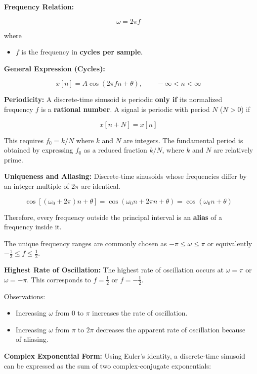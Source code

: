 \textbf{Frequency Relation:}

\[  
\omega=2\pi f  
\]

where

\begin{itemize}
\tightlist
\item
  \(f\) is the frequency in \textbf{cycles per sample}.
\end{itemize}

\textbf{General Expression (Cycles):}

\[  
x[n]=A\cos(2\pi fn+\theta),  
\qquad -\infty<n<\infty  
\]

\textbf{Periodicity:} A discrete-time sinusoid is periodic \textbf{only
if} its normalized frequency \(f\) is a \textbf{rational number}. A
signal is periodic with period \(N\) (\(N>0\)) if

\[  
x[n+N]=x[n]
\]

This requires \(f_0=k/N\) where \(k\) and \(N\) are integers. The
fundamental period is obtained by expressing \(f_0\) as a reduced
fraction \(k/N\), where \(k\) and \(N\) are relatively prime.

\textbf{Uniqueness and Aliasing:} Discrete-time sinusoids whose
frequencies differ by an integer multiple of \(2\pi\) are identical.

\[  
\cos\!\left[(\omega_0+2\pi)n+\theta\right]
=
\cos\!\left(\omega_0n+2\pi n+\theta\right)
=
\cos(\omega_0n+\theta)  
\]

Therefore, every frequency outside the principal interval is an
\textbf{alias} of a frequency inside it.

The unique frequency ranges are commonly chosen as
\(-\pi\le\omega\le\pi\) or equivalently \(-\frac12\le f\le\frac12\).

\textbf{Highest Rate of Oscillation:} The highest rate of oscillation
occurs at \(\omega=\pi\) or \(\omega=-\pi\). This corresponds to
\(f=\frac12\) or \(f=-\frac12\).

Observations:

\begin{itemize}
\tightlist
\item
  Increasing \(\omega\) from \(0\) to \(\pi\) increases the rate of
  oscillation.
\item
  Increasing \(\omega\) from \(\pi\) to \(2\pi\) decreases the apparent
  rate of oscillation because of aliasing.
\end{itemize}

\textbf{Complex Exponential Form:} Using Euler's identity, a
discrete-time sinusoid can be expressed as the sum of two
complex-conjugate exponentials:

